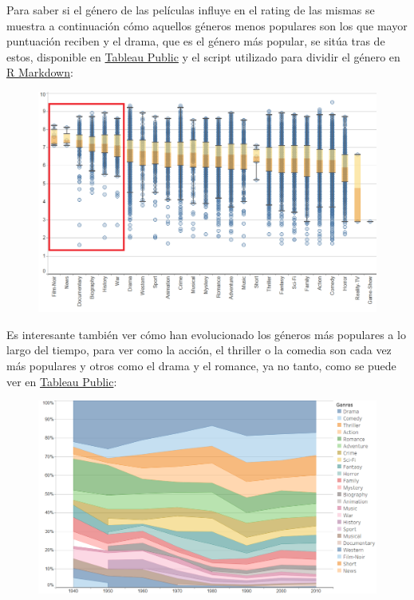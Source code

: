 \documentclass{article}
\begin{document}
Para saber si el género de las películas influye en el rating de las mismas se muestra a continuación cómo aquellos géneros menos populares son los que mayor puntuación reciben y el drama, que es el género más popular, se sitúa tras de estos, disponible en \href{https://public.tableau.com/profile/javier6580\#!/vizhome/proyecto_fin_de_master_genre/rating_genre}{Tableau Public} y el script utilizado para dividir el género en \href{https://github.com/pozueco/proyecto_fin_de_master/blob/master/split_genres.md}{R Markdown}:

\begin{figure}[h]
\centering
\includegraphics[width=4.5in,clip,keepaspectratio]{./images_latex/rating_genre}
\end{figure}

\clearpage

Es interesante también ver cómo han evolucionado los géneros más populares a lo largo del tiempo, para ver como la acción, el thriller o la comedia son cada vez más populares y otros como el drama y el romance, ya no tanto, como se puede ver en \href{https://public.tableau.com/profile/javier6580\#!/vizhome/proyecto_fin_de_master_genre/rating_genre}{Tableau Public}:

\begin{figure}[h]
\centering
\includegraphics[width=4.5in,clip,keepaspectratio]{./images_latex/genre_year}
\end{figure}
\end{document}
